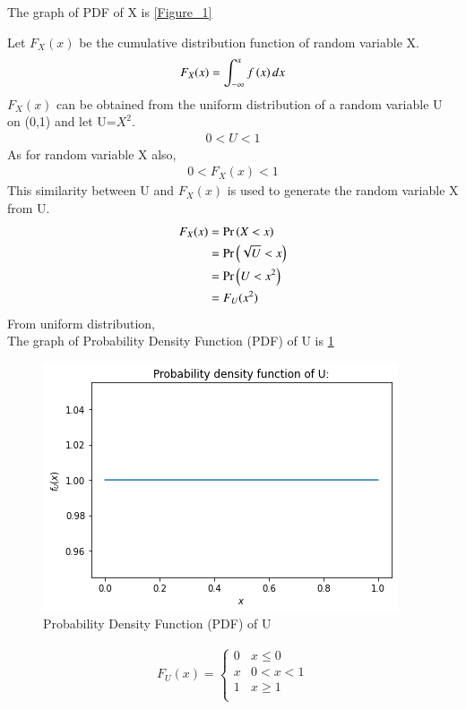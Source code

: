 \documentclass[journal,12pt,twocolumn]{IEEEtran}
\begin{document}
The graph of PDF of X is \ref{Figure_1}
\par Let $F_X(x)$ be the cumulative distribution function of random variable X.
\begin{align}
    F_X(x)=\int_{-\infty}^x f\left(x\right) dx\label{x}
\end{align}
$F_X(x)$ can be obtained from the uniform distribution of a random variable U on (0,1) and let U=$X^2$. 
\begin{align}
    0 < U < 1
\end{align}
As for random variable X also,
\begin{align}
    0 < F_X(x) < 1
\end{align}
This similarity between U and $F_X(x)$ is used to generate the random variable X from U.
\begin{align}
    F_X(x)&= \Pr\left(X<x\right)\\
    &=\Pr\left(\sqrt{U}<x\right)\\
    &=\Pr\left(U<x^2\right)\\
    &=F_U(x^2)\label{y}
\end{align}
From uniform distribution,
\\The graph of Probability Density Function (PDF) of U is \ref{Figure_2}
\begin{figure}[ht]
    \centering
    \includegraphics[width=\columnwidth]{assign2_2.png}
    \caption{Probability Density Function (PDF) of U}
    \label{Figure_2}
\end{figure}
\begin{align}
    F_U(x)=
    \begin{cases}
0 & x\leq0\\
x & 0<x<1
\\
1 & x\geq1\label{z}\\
\end{cases}
\end{align}
\end{document}
